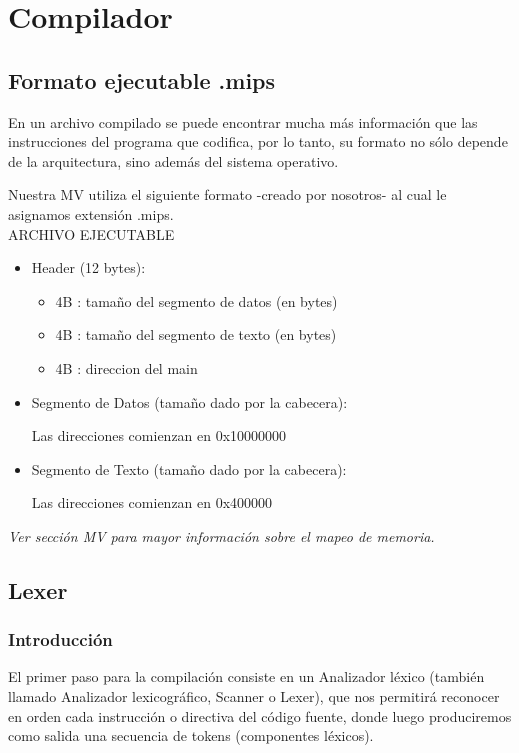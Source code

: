 \documentclass[12pt]{article}
\begin{document}
\section{Compilador}
\subsection{Formato ejecutable .mips}

En un archivo compilado se puede encontrar mucha más información que las instrucciones del programa que codifica, por lo tanto, su formato no sólo depende de la arquitectura, sino además del sistema operativo.

Nuestra MV utiliza el siguiente formato -creado por nosotros- al cual le asignamos extensión .mips.
\\

ARCHIVO EJECUTABLE
\begin{itemize}
\item Header (12 bytes):
	\begin{itemize}
    		\item 4B : tamaño del segmento de datos (en bytes)

  		\item 4B : tamaño del segmento de texto (en bytes)

    		\item 4B : direccion del main
	\end{itemize}
\item Segmento de Datos (tamaño dado por la cabecera):

    Las direcciones comienzan en 0x10000000

\item Segmento de Texto (tamaño dado por la cabecera):

    Las direcciones comienzan en 0x400000
\end{itemize}
\textit{Ver sección MV para mayor información sobre el mapeo de memoria.}

\subsection{Lexer}

\subsubsection{Introducción}

El primer paso para la compilación consiste en un Analizador léxico (también llamado Analizador lexicográfico, Scanner o Lexer), que nos permitirá reconocer en orden cada instrucción o directiva del código fuente, donde luego produciremos como salida una secuencia de tokens (componentes léxicos).
\end{document}
